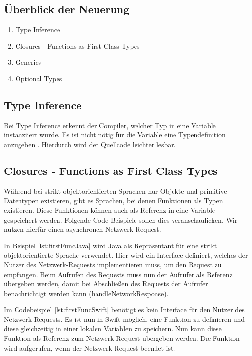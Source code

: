 \subsection{Überblick der Neuerung}
\begin{enumerate}
\item Type Inference
\item Closures - Functions as First Class Types
\item Generics
\item Optional Types
\end{enumerate}

\subsection{Type Inference}
Bei Type Inference erkennt der Compiler, welcher Typ in eine Variable instanziiert wurde. Es ist nicht nötig für die Variable eine Typendefinition anzugeben \cite{Apple:2014sp}. Hierdurch wird der Quellcode leichter lesbar. 


\subsection{Closures - Functions as First Class Types}
\label{ch:closures}
Während bei strikt objektorientierten Sprachen nur Objekte und primitive Datentypen existieren, gibt es Sprachen, bei denen Funktionen als Typen existieren. Diese Funktionen können auch als Referenz in eine Variable gespeichert werden. Folgende Code Beispiele sollen dies veranschaulichen. Wir nutzen hierfür einen asynchronen Netzwerk-Request\cite{Apple:2014sp}.

 In Beispiel \ref{lst:firstFuncJava} wird Java als Repräsentant für eine strikt objektorientierte Sprache verwendet. Hier wird ein Interface definiert, welches der Nutzer des Netzwerk-Requests implementieren muss, um den Request zu empfangen. Beim Aufrufen des Requests muss nun der Aufrufer als Referenz übergeben werden, damit bei Abschließen des Requests der Aufrufer benachrichtigt werden kann (handleNetworkResponse). 

Im Codebeispiel \ref{lst:firstFuncSwift} benötigt es kein Interface für den Nutzer des Netzwerk-Requests. Es ist nun in Swift möglich, eine Funktion zu definieren und diese gleichzeitig in einer lokalen Variablen zu speichern. Nun kann diese Funktion als Referenz zum Netzwerk-Request übergeben werden. Die Funktion wird aufgerufen, wenn der Netzwerk-Request beendet ist. 

